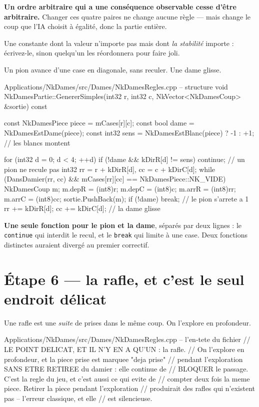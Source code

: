\begin{nkretenir}
\textbf{Un ordre arbitraire qui a une conséquence observable cesse d'être
arbitraire.} Changer ces quatre paires ne change aucune règle --- mais change le
coup que l'IA choisit à égalité, donc la partie entière.

Une constante dont la valeur n'importe pas mais dont \emph{la stabilité}
importe : écrivez-le, sinon quelqu'un les réordonnera pour faire joli.
\end{nkretenir}

Un pion avance d'une case en diagonale, sans reculer. Une dame glisse.

\begin{nkcode}{Applications/NkDames/src/Dames/NkDamesRegles.cpp -- structure}
void NkDamesPartie::GenererSimples(int32 r, int32 c, NkVector<NkDamesCoup> &sortie) const {
    const NkDamesPiece piece = mCases[r][c];
    const bool dame  = NkDamesEstDame(piece);
    const int32 sens = NkDamesEstBlanc(piece) ? -1 : +1;   // les blancs montent

    for (int32 d = 0; d < 4; ++d) {
        if (!dame && kDirR[d] != sens) { continue; }       // un pion ne recule pas
        int32 rr = r + kDirR[d], cc = c + kDirC[d];
        while (DansDamier(rr, cc) && mCases[rr][cc] == NkDamesPiece::NK_VIDE) {
            NkDamesCoup m;
            m.depR = (int8)r;  m.depC = (int8)c;
            m.arrR = (int8)rr; m.arrC = (int8)cc;
            sortie.PushBack(m);
            if (!dame) { break; }                          // le pion s'arrete a 1
            rr += kDirR[d]; cc += kDirC[d];                // la dame glisse
        }
    }
}
\end{nkcode}

\begin{nkretenir}
\textbf{Une seule fonction pour le pion et la dame}, séparés par deux lignes :
le \texttt{continue} qui interdit le recul, et le \texttt{break} qui limite à une
case. Deux fonctions distinctes auraient divergé au premier correctif.
\end{nkretenir}

\section{Étape 6 --- la rafle, et c'est le seul endroit délicat}

Une rafle est une \emph{suite} de prises dans le même coup. On l'explore en
profondeur.

\begin{nkcode}{Applications/NkDames/src/Dames/NkDamesRegles.cpp -- l'en-tete du fichier}
// LE POINT DELICAT, ET IL N'Y EN A QU'UN : la rafle.
//   On l'explore en profondeur, et la piece prise est marquee "deja prise"
//   pendant l'exploration SANS ETRE RETIREE du damier : elle continue de
//   BLOQUER le passage. C'est la regle du jeu, et c'est aussi ce qui evite de
//   compter deux fois la meme piece. Retirer la piece pendant l'exploration
//   produirait des rafles qui n'existent pas -- l'erreur classique, et elle
//   est silencieuse.
\end{nkcode}

